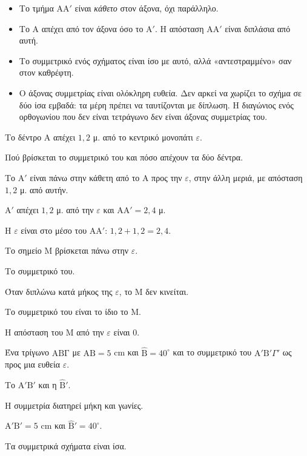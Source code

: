 \begin{prosoxi}
\begin{itemize}[leftmargin=1.2em,itemsep=0.3ex,topsep=2pt]
\item Το τμήμα $\mathrm{ΑΑ}'$ είναι \emph{κάθετο} στον άξονα, όχι παράλληλο.
\item Το $\mathrm{Α}$ απέχει από τον άξονα όσο το $\mathrm{Α}'$. Η απόσταση $\mathrm{ΑΑ}'$ είναι διπλάσια από αυτή.
\item Το συμμετρικό ενός σχήματος είναι ίσο με αυτό, αλλά «αντεστραμμένο» σαν στον καθρέφτη.
\item Ο άξονας συμμετρίας είναι ολόκληρη ευθεία. Δεν αρκεί να χωρίζει το σχήμα σε δύο ίσα εμβαδά: τα μέρη πρέπει να ταυτίζονται με δίπλωση. Η διαγώνιος ενός ορθογωνίου που δεν είναι τετράγωνο δεν είναι άξονας συμμετρίας του.
\end{itemize}
\end{prosoxi}


\tixero Το δέντρο $\mathrm{Α}$ απέχει $1{,}2$ μ. από το κεντρικό μονοπάτι $\varepsilon$.\par
\tithelo Πού βρίσκεται το συμμετρικό του και πόσο απέχουν τα δύο δέντρα.\par
\possindeo Το $\mathrm{Α}'$ είναι πάνω στην κάθετη από το $\mathrm{Α}$ προς την $\varepsilon$, στην άλλη μεριά, με απόσταση $1{,}2$ μ. από αυτήν.\par
\apantisi $\mathrm{Α}'$ απέχει $1{,}2$ μ. από την $\varepsilon$ και $\mathrm{ΑΑ}'=2{,}4$ μ.\par
\elegxos Η $\varepsilon$ είναι στο μέσο του $\mathrm{ΑΑ}'$: $1{,}2+1{,}2=2{,}4$.

\tixero Το σημείο $\mathrm{Μ}$ βρίσκεται πάνω στην $\varepsilon$.\par
\tithelo Το συμμετρικό του.\par
\possindeo Όταν διπλώνω κατά μήκος της $\varepsilon$, το $\mathrm{Μ}$ δεν κινείται.\par
\apantisi Το συμμετρικό του είναι το ίδιο το $\mathrm{Μ}$.\par
\elegxos Η απόσταση του $\mathrm{Μ}$ από την $\varepsilon$ είναι $0$.

\tixero Ένα τρίγωνο $\mathrm{ΑΒΓ}$ με $\mathrm{ΑΒ}=5$ cm και $\hat{\mathrm{Β}}=40^\circ$ και το συμμετρικό του $\mathrm{Α}'\mathrm{Β}'\Gamma'$ ως προς μια ευθεία $\varepsilon$.\par
\tithelo Το $\mathrm{Α}'\mathrm{Β}'$ και η $\hat{\mathrm{Β}}'$.\par
\possindeo Η συμμετρία διατηρεί μήκη και γωνίες.\par
\apantisi $\mathrm{Α}'\mathrm{Β}'=5$ cm και $\hat{\mathrm{Β}}'=40^\circ$.\par
\elegxos Τα συμμετρικά σχήματα είναι ίσα.

